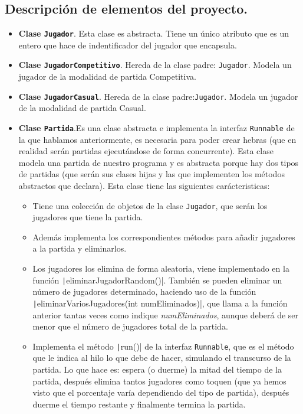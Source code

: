 \documentclass[a4paper,12pt]{article}
\begin{document}
		\subsection{Descripción de elementos del proyecto.}
			\begin{itemize}
				\item \textbf{Clase \texttt{Jugador}}. Esta clase es abstracta. Tiene un único atributo que es un entero que hace de indentificador del jugador que encapsula.

				\item \textbf{Clase \texttt{JugadorCompetitivo}}. Hereda de la clase padre: \texttt{Jugador}. Modela un jugador de la modalidad de partida Competitiva. 
				
				\item \textbf{Clase \texttt{JugadorCasual}}. Hereda de la clase padre:\texttt{Jugador}. Modela un jugador de la modalidad de partida Casual.
				
				\item \textbf{Clase \texttt{Partida}}.Es una clase abstracta e implementa la interfaz \texttt{Runnable} de la que hablamos anteriormente, es necesaria para poder crear hebras (que en realidad serán partidas ejecutándose de forma concurrente). Esta clase modela una partida de nuestro programa y es abstracta porque hay dos tipos de partidas (que serán sus clases hijas y las que implementen los métodos abstractos que declara). Esta clase tiene las siguientes carácteristicas:
				\begin{itemize}
					\item Tiene una colección de objetos de la clase \texttt{Jugador}, que serán los jugadores que tiene la partida. 
					
					\item Además implementa los correspondientes métodos para añadir jugadores a la partida y eliminarlos.
					
					\item Los jugadores los elimina de forma aleatoria, viene implementado en la función \texttt|eliminarJugadorRandom()|. También se pueden eliminar un número de jugadores determinado, haciendo uso de la función \texttt|eliminarVariosJugadores(int numEliminados)|, que llama  a la función anterior tantas veces como indique \textit{numEliminados}, aunque deberá de ser menor que el número de jugadores total de la partida.
					
					\item Implementa el método \texttt|run()| de la interfaz \texttt{Runnable}, que es el método que le indica al hilo lo que debe de hacer, simulando el transcurso de la partida. Lo que hace es: espera (o duerme) la mitad del tiempo de la partida, después elimina tantos jugadores como toquen (que ya hemos visto que el porcentaje varía dependiendo del tipo de partida), después duerme el tiempo restante y finalmente termina la partida.
					

\end{itemize}
\end{itemize}
\end{document}
